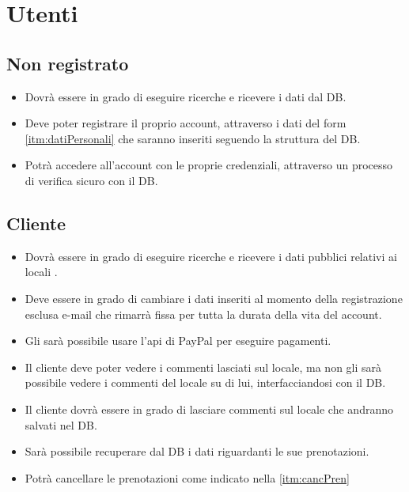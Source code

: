 \section{Utenti}

\subsection{Non registrato}
\begin{itemize}
    \item Dovrà essere in grado di eseguire ricerche e ricevere i dati dal DB.
    \item Deve poter registrare il proprio account, attraverso i dati del form 
    \ref{itm:datiPersonali} che saranno inseriti seguendo la struttura del DB.
    \item Potrà accedere all'account con le proprie credenziali, attraverso un processo di 
    verifica sicuro con il DB.
\end{itemize}

\subsection{Cliente}
\begin{itemize}
    \item Dovrà essere in grado di eseguire ricerche e ricevere i dati pubblici relativi ai 
    locali .
    \item Deve essere in grado di cambiare i dati inseriti al momento della registrazione 
    esclusa e-mail che rimarrà fissa per tutta la durata della vita del account.
    \item Gli sarà possibile usare l’api di PayPal per eseguire pagamenti.
    \item Il cliente deve poter vedere i commenti lasciati sul locale, ma non gli sarà possibile 
    vedere i commenti del locale su di lui, interfacciandosi con il DB.
    \item Il cliente dovrà essere in grado di lasciare commenti sul locale che andranno salvati 
    nel DB.
    \item Sarà possibile recuperare dal DB i dati riguardanti le sue prenotazioni.
    \item Potrà cancellare le prenotazioni come indicato nella \ref{itm:cancPren}
\end{itemize}

